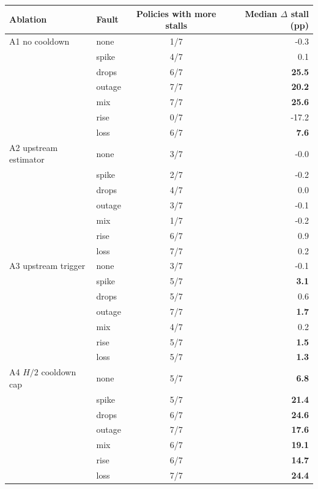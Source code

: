 \begin{tabular}{l l c r}
\toprule
Ablation & Fault & Policies with more stalls & Median $\Delta$ stall (pp) \\
\midrule
A1 no cooldown & none & 1/7 & -0.3 \\
 & spike & 4/7 & 0.1 \\
 & drops & 6/7 & \textbf{25.5} \\
 & outage & 7/7 & \textbf{20.2} \\
 & mix & 7/7 & \textbf{25.6} \\
 & rise & 0/7 & -17.2 \\
 & loss & 6/7 & \textbf{7.6} \\
\addlinespace
A2 upstream estimator & none & 3/7 & -0.0 \\
 & spike & 2/7 & -0.2 \\
 & drops & 4/7 & 0.0 \\
 & outage & 3/7 & -0.1 \\
 & mix & 1/7 & -0.2 \\
 & rise & 6/7 & 0.9 \\
 & loss & 7/7 & 0.2 \\
\addlinespace
A3 upstream trigger & none & 3/7 & -0.1 \\
 & spike & 5/7 & \textbf{3.1} \\
 & drops & 5/7 & 0.6 \\
 & outage & 7/7 & \textbf{1.7} \\
 & mix & 4/7 & 0.2 \\
 & rise & 5/7 & \textbf{1.5} \\
 & loss & 5/7 & \textbf{1.3} \\
\addlinespace
A4 $H/2$ cooldown cap & none & 5/7 & \textbf{6.8} \\
 & spike & 5/7 & \textbf{21.4} \\
 & drops & 6/7 & \textbf{24.6} \\
 & outage & 7/7 & \textbf{17.6} \\
 & mix & 6/7 & \textbf{19.1} \\
 & rise & 6/7 & \textbf{14.7} \\
 & loss & 7/7 & \textbf{24.4} \\
\bottomrule
\end{tabular}

